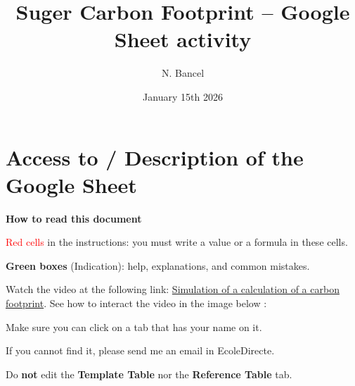 \documentclass{exam}
\title{Suger Carbon Footprint -- Google Sheet activity}
\author{N. Bancel}
\date{January 15th 2026}
\begin{document}
{\let\newpage\relax\maketitle}

\section{Access to / Description of the Google Sheet}

\begin{Indication}
\textbf{How to read this document}
\begin{compactitem}
  \item \textcolor{red}{Red cells} in the instructions: you must write a value or a formula in these cells.
  \item \textbf{Green boxes} (Indication): help, explanations, and common mistakes.
\end{compactitem}
\end{Indication}

\begin{questions}
  \question Watch the video at the following link: \href{https://docs.google.com/spreadsheets/d/1dNwbzpJt8uUCMYMr-9A3AGU0R27vBdNBqc6oD62n8s8/edit?gid=2097997664#gid=2097997664}{Simulation of a calculation of a carbon footprint}. See how to interact the video in the image below : 


  \question Make sure you can click on a tab that has your name on it.
  \begin{compactitem}
    \item If you cannot find it, please send me an email in EcoleDirecte.
    \item Do \textbf{not} edit the \textbf{Template Table} nor the \textbf{Reference Table} tab.
  \end{compactitem}
\end{questions}
\end{document}
